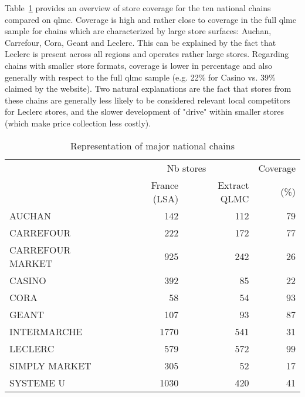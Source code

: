 \documentclass[english]{article}
\begin{document}
Table~\ref{tab:qlmc_chain_repr} provides an overview of store coverage for the ten national chains compared on qlmc. Coverage is high and rather close to coverage in the full qlmc sample for chains which are characterized by large store surfaces: Auchan, Carrefour, Cora, Geant and Leclerc. This can be explained by the fact that Leclerc is present across all regions and operates rather large stores. Regarding chains with smaller store formats, coverage is lower in percentage and also generally with respect to the full qlmc sample (e.g. 22\% for Casino vs. 39\% claimed by the website). Two natural explanations are the fact that stores from these chains are generally less likely to be considered relevant local competitors for Leclerc stores, and the slower development of "drive" within smaller stores (which make price collection less costly).

\begin{table}[H]
\renewcommand{\arraystretch}{0.7}%
\caption{Representation of major national chains}\label{tab:qlmc_chain_repr}
\small
\begin{tabular}{lrrr}
\toprule
{} &  \multicolumn{2}{c}{Nb stores}   &  Coverage      \\
{} &   France (LSA) & Extract QLMC    & (\%)           \\
\midrule
AUCHAN           &            142 &             112 &            79 \\
CARREFOUR        &            222 &             172 &            77 \\
CARREFOUR MARKET &            925 &             242 &            26 \\
CASINO           &            392 &              85 &            22 \\
CORA             &             58 &              54 &            93 \\
GEANT            &            107 &              93 &            87 \\
INTERMARCHE      &           1770 &             541 &            31 \\
LECLERC          &            579 &             572 &            99 \\
SIMPLY MARKET    &            305 &              52 &            17 \\
SYSTEME U        &           1030 &             420 &            41 \\
\bottomrule
\bottomrule
\end{tabular}
\end{table}
\end{document}
